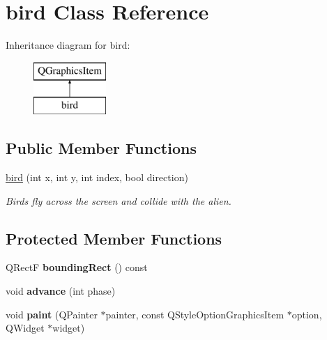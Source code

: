 \hypertarget{classbird}{\section{bird Class Reference}
\label{classbird}
}
Inheritance diagram for bird\-:\begin{figure}[H]
\begin{center}
\leavevmode
\includegraphics[height=2.000000cm]{classbird}
\end{center}
\end{figure}
\subsection*{Public Member Functions}
\begin{DoxyCompactItemize}
\item 
\hyperlink{classbird_a140b91610200bc6580693c3aae7a362b}{bird} (int x, int y, int index, bool direction)
\begin{DoxyCompactList}\small\item\em Birds fly across the screen and collide with the alien. \end{DoxyCompactList}\end{DoxyCompactItemize}
\subsection*{Protected Member Functions}
\begin{DoxyCompactItemize}
\item 
\hypertarget{classbird_a237e6ad81998aeaf1be45bcb1e04dc7f}{Q\-Rect\-F {\bfseries bounding\-Rect} () const }\label{classbird_a237e6ad81998aeaf1be45bcb1e04dc7f}

\item 
\hypertarget{classbird_ac3888e6dad82bdff34cb6219b474fcb1}{void {\bfseries advance} (int phase)}\label{classbird_ac3888e6dad82bdff34cb6219b474fcb1}

\item 
\hypertarget{classbird_adfe0751f94a46ac337161af3f5fe6a66}{void {\bfseries paint} (Q\-Painter $\ast$painter, const Q\-Style\-Option\-Graphics\-Item $\ast$option, Q\-Widget $\ast$widget)}\label{classbird_adfe0751f94a46ac337161af3f5fe6a66}

\end{DoxyCompactItemize}
